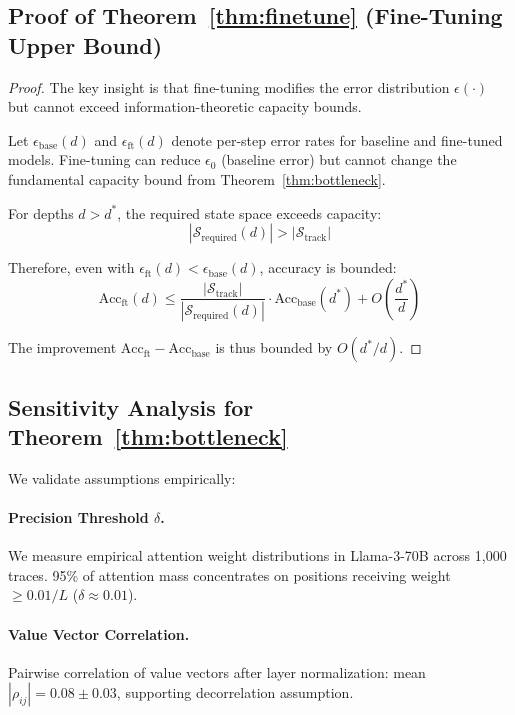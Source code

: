 \documentclass{article}
\theoremstyle{plain}
\theoremstyle{definition}
\theoremstyle{remark}
\begin{document}
\subsection{Proof of Theorem~\ref{thm:finetune} (Fine-Tuning Upper Bound)}

\begin{proof}
The key insight is that fine-tuning modifies the error distribution $\epsilon(\cdot)$ but cannot exceed information-theoretic capacity bounds.

Let $\epsilon_{\text{base}}(d)$ and $\epsilon_{\text{ft}}(d)$ denote per-step error rates for baseline and fine-tuned models. Fine-tuning can reduce $\epsilon_0$ (baseline error) but cannot change the fundamental capacity bound from Theorem~\ref{thm:bottleneck}.

For depths $d > d^*$, the required state space exceeds capacity:
\begin{equation}
|\mathcal{S}_{\text{required}}(d)| > |\mathcal{S}_{\text{track}}|
\end{equation}

Therefore, even with $\epsilon_{\text{ft}}(d) < \epsilon_{\text{base}}(d)$, accuracy is bounded:
\begin{equation}
\text{Acc}_{\text{ft}}(d) \leq \frac{|\mathcal{S}_{\text{track}}|}{|\mathcal{S}_{\text{required}}(d)|} \cdot \text{Acc}_{\text{base}}(d^*) + O\left(\frac{d^*}{d}\right)
\end{equation}

The improvement $\text{Acc}_{\text{ft}} - \text{Acc}_{\text{base}}$ is thus bounded by $O(d^*/d)$.
\end{proof}

\subsection{Sensitivity Analysis for Theorem~\ref{thm:bottleneck}}
\label{app:sensitivity}

We validate assumptions empirically:

\paragraph{Precision Threshold $\delta$.} We measure empirical attention weight distributions in Llama-3-70B across 1,000 traces. 95\% of attention mass concentrates on positions receiving weight $\geq 0.01/L$ ($\delta \approx 0.01$).

\paragraph{Value Vector Correlation.} Pairwise correlation of value vectors after layer normalization: mean $|\rho_{ij}| = 0.08 \pm 0.03$, supporting decorrelation assumption.
\end{document}
